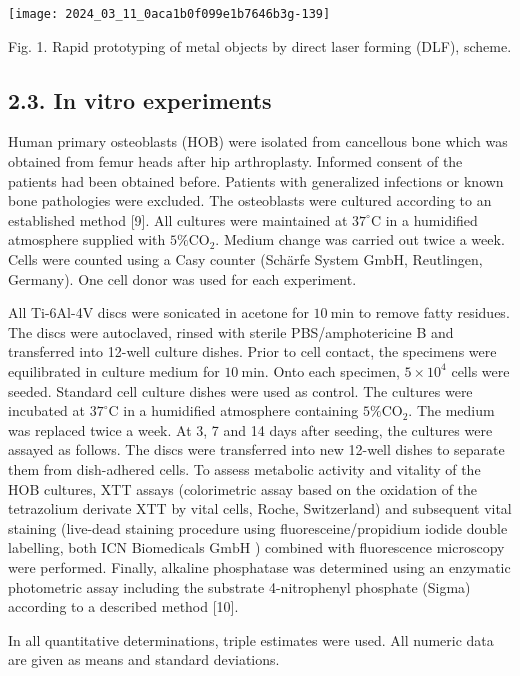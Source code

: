 \documentclass[10pt]{article}
\begin{document}
\begin{center}
\texttt{[image: 2024\_03\_11\_0aca1b0f099e1b7646b3g-139]}
\end{center}

Fig. 1. Rapid prototyping of metal objects by direct laser forming (DLF), scheme.

\subsection*{2.3. In vitro experiments}
Human primary osteoblasts (HOB) were isolated from cancellous bone which was obtained from femur heads after hip arthroplasty. Informed consent of the patients had been obtained before. Patients with generalized infections or known bone pathologies were excluded. The osteoblasts were cultured according to an established method [9]. All cultures were maintained at $37^{\circ} \mathrm{C}$ in a humidified atmosphere supplied with $5 \% \mathrm{CO}_{2}$. Medium change was carried out twice a week. Cells were counted using a Casy counter (Schärfe System GmbH, Reutlingen, Germany). One cell donor was used for each experiment.

All Ti-6Al-4V discs were sonicated in acetone for $10 \mathrm{~min}$ to remove fatty residues. The discs were autoclaved, rinsed with sterile PBS/amphotericine B and transferred into 12-well culture dishes. Prior to cell contact, the specimens were equilibrated in culture medium for $10 \mathrm{~min}$. Onto each specimen, $5 \times 10^{4}$ cells were seeded. Standard cell culture dishes were used as control. The cultures were incubated at $37^{\circ} \mathrm{C}$ in a humidified atmosphere containing $5 \% \mathrm{CO}_{2}$. The medium was replaced twice a week. At 3, 7 and 14 days after seeding, the cultures were assayed as follows. The discs were transferred into new 12-well dishes to separate them from dish-adhered cells. To assess metabolic activity and vitality of the HOB cultures, XTT assays (colorimetric assay based on the oxidation of the tetrazolium derivate XTT by vital cells, Roche, Switzerland) and subsequent vital staining (live-dead staining procedure using fluoresceine/propidium iodide double labelling, both ICN Biomedicals $\mathrm{GmbH}$ ) combined with fluorescence microscopy were performed. Finally, alkaline phosphatase was determined using an enzymatic photometric assay including the substrate 4-nitrophenyl phosphate (Sigma) according to a described method [10].

In all quantitative determinations, triple estimates were used. All numeric data are given as means and standard deviations.
\end{document}
